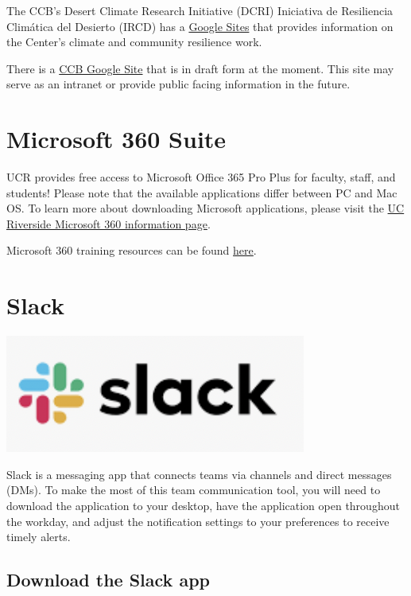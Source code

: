 \documentclass[
]{book}
\begin{document}
The CCB's Desert Climate Research Initiative (DCRI) \textbar{} Iniciativa de Resiliencia Climática del Desierto (IRCD) has a \href{https://sites.google.com/ucr.edu/ccb-dcri/home}{Google Sites} that provides information on the Center's climate and community resilience work.

There is a \href{https://sites.google.com/ucr.edu/ccbucr/home}{CCB Google Site} that is in draft form at the moment. This site may serve as an intranet or provide public facing information in the future.

\hypertarget{microsoft-360-suite}{%
\section{Microsoft 360 Suite}\label{microsoft-360-suite}}

UCR provides free access to Microsoft Office 365 Pro Plus for faculty, staff, and students! Please note that the available applications differ between PC and Mac OS. To learn more about downloading Microsoft applications, please visit the
\href{https://ucrsupport.service-now.com/ucr_portal/?id=kb_article\&sys_id=0868da980f602f0086b7c7dce1050ee0}{UC Riverside Microsoft 360 information page}.

Microsoft 360 training resources can be found \href{https://support.microsoft.com/en-us/training}{here}.

\hypertarget{slack}{%
\section{Slack}\label{slack}}

\begin{flushleft}\includegraphics[width=0.3\linewidth]{images/slack} \end{flushleft}

Slack is a messaging app that connects teams via channels and direct messages (DMs). To make the most of this team communication tool, you will need to download the application to your desktop, have the application open throughout the workday, and adjust the notification settings to your preferences to receive timely alerts.

\hypertarget{download-the-slack-app}{%
\subsection{Download the Slack app}\label{download-the-slack-app}}
\end{document}
